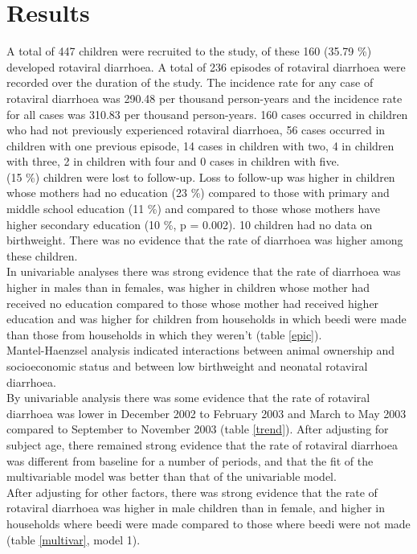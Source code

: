 \documentclass[11pt,a4paper]{article}\usepackage{graphicx, color}
\begin{document}
\section{Results}
\indent A total of 447 children were recruited to the study, of these 160 (35.79 \%) developed rotaviral diarrhoea. 
A total of 236 episodes of rotaviral diarrhoea were recorded over the duration of the study.
The incidence rate for any case of rotaviral diarrhoea was 290.48 per thousand person-years and the incidence rate for all cases was 310.83 per thousand person-years.
160 cases occurred in children who had not previously experienced rotaviral diarrhoea, 56 cases occurred in children with one previous episode, 14 cases in children with two, 4 in children with three, 2 in children with four and 0 cases in children with five. \\
 (15 \%) children were lost to follow-up. 
Loss to follow-up was higher in children whose mothers had no education (23 \%) compared to those with primary and middle school education (11 \%) and compared to those whose mothers have higher secondary education (10 \%, p = 0.002). 
10 children had no data on birthweight. 
There was no evidence that the rate of diarrhoea was higher among these children. \\
\indent In univariable analyses there was strong evidence that the rate of diarrhoea was higher in males than in females, was higher in children whose mother had received no education compared to those whose mother had received higher education and was higher for children from households in which beedi were made than those from households in which they weren't (table \ref{epic}). \\
\indent Mantel-Haenzsel analysis indicated interactions between animal ownership and socioeconomic status and between low birthweight and neonatal rotaviral diarrhoea. \\
\indent By univariable analysis there was some evidence that the rate of rotaviral diarrhoea was lower in December 2002 to February 2003 and March to May 2003 compared to September to November 2003 (table \ref{trend}).
After adjusting for subject age, there remained strong evidence that the rate of rotaviral diarrhoea was different from baseline for a number of periods, and that the fit of the multivariable model was better than that of the univariable model. \\
\indent After adjusting for other factors, there was strong evidence that the rate of rotaviral diarrhoea was higher in male children than in female, and higher in households where beedi were made compared to those where beedi were not made (table \ref{multivar}, model 1).
\end{document}
